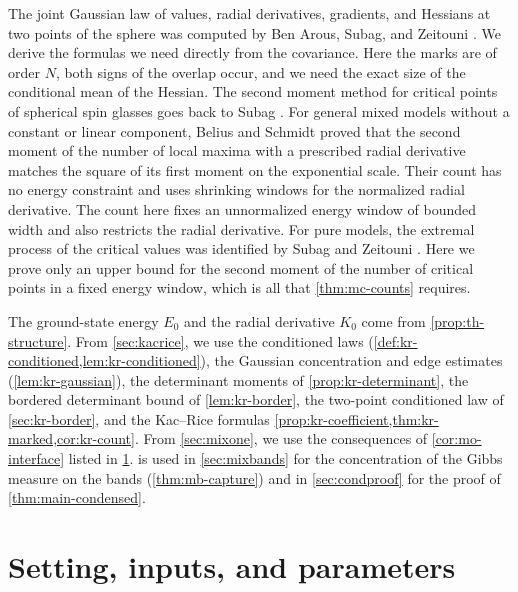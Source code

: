 The joint Gaussian law of values, radial derivatives, gradients, and Hessians at two points of the sphere was computed by Ben Arous, Subag, and Zeitouni \cite[Lemmas~13--15 and (4.6)--(4.10); Lemma~54 and (A.2)--(A.8)]{BenArousSubagZeitouni2020}.
We derive the formulas we need directly from the covariance. Here the marks are of order $N$, both signs of the overlap occur, and we need the exact size of the conditional mean of the Hessian. The second moment method for critical points of spherical spin glasses goes back to Subag \cite{Subag2017complexity}. For general mixed models without a constant or linear component, Belius and Schmidt \cite[Theorem~1.1]{BeliusSchmidt2022} proved that the second moment of the number of local maxima with a prescribed radial derivative matches the square of its first moment on the exponential scale. Their count has no energy constraint and uses shrinking windows for the normalized radial derivative. The count here fixes an unnormalized energy window of bounded width and also restricts the radial derivative. For pure models, the extremal process of the critical values was identified by Subag and Zeitouni \cite{SubagZeitouni2017}. Here we prove only an upper bound for the second moment of the number of critical points in a fixed energy window, which is all that \cref{thm:mc-counts} requires.

The ground-state energy $E_0$ and the radial derivative $K_0$ come from \cref{prop:th-structure}. From \cref{sec:kacrice}, we use the conditioned laws (\cref{def:kr-conditioned,lem:kr-conditioned}), the Gaussian concentration and edge estimates (\cref{lem:kr-gaussian}), the determinant moments of \cref{prop:kr-determinant}, the bordered determinant bound of \cref{lem:kr-border}, the two-point conditioned law of \cref{sec:kr-border}, and the Kac--Rice formulas \cref{prop:kr-coefficient,thm:kr-marked,cor:kr-count}. From \cref{sec:mixone}, we use the consequences of \cref{cor:mo-interface} listed in \cref{sec:mp-setting}.  is used in \cref{sec:mixbands} for the concentration of the Gibbs measure on the bands (\cref{thm:mb-capture}) and in \cref{sec:condproof} for the proof of \cref{thm:main-condensed}.


\section{Setting, inputs, and parameters}\label{sec:mp-setting}

